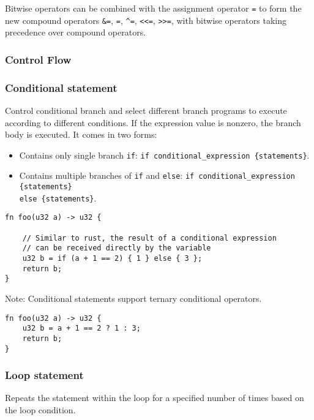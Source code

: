 Bitwise operators can be combined with the assignment operator \texttt{=} to form the new compound operators \texttt{\&=}, \texttt{\textbar=}, \texttt{\textasciicircum=}, \texttt{<<=}, \texttt{>>=}, 
with bitwise operators taking precedence over compound operators.

\subsubsection{Control Flow}

\subsubsection*{Conditional statement}

Control conditional branch and select different branch programs to execute according to different conditions. 
If the expression value is nonzero, the branch body is executed.
It comes in two forms:

\begin{itemize}
    \item Contains only single branch \verb|if|: \verb|if conditional_expression {statements}|.
    \item Contains multiple branches of \verb|if| and \verb|else|: 
    \verb|if conditional_expression {statements}| \\
    \verb|else {statements}|.

\end{itemize}

\begin{lstlisting}
fn foo(u32 a) -> u32 {
    
    // Similar to rust, the result of a conditional expression 
    // can be received directly by the variable
    u32 b = if (a + 1 == 2) { 1 } else { 3 };
    return b;
}
\end{lstlisting}

Note: Conditional statements support ternary conditional operators.

\begin{lstlisting}
fn foo(u32 a) -> u32 {
    u32 b = a + 1 == 2 ? 1 : 3;
    return b;
}
\end{lstlisting}

\subsubsection*{Loop statement}

Repeats the statement within the loop for a specified number of times based on the loop condition.

